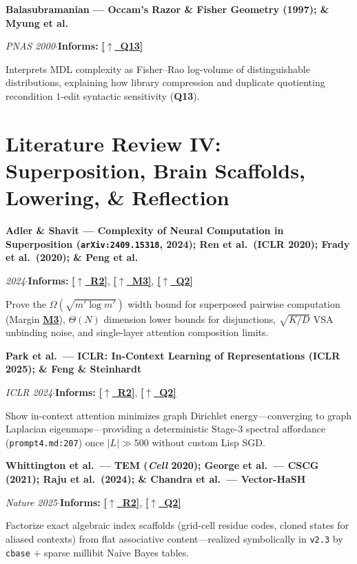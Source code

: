 \documentclass[12pt]{article}
\newcommand{\secback}[2]{\hyperref[#1]{\textcolor{linkblue}{\textbf{\small[\(\uparrow\)~#2]}}}}
\newcommand{\litentry}[4]{%
  \par\medskip\noindent\hypertarget{lit:#1}{}%
  \textbf{#2}\par\nopagebreak\noindent
  {\footnotesize\textit{#3}\quad$\cdot$\quad\textbf{Informs:} #4}\par\nopagebreak\smallskip\noindent\ignorespaces
}
\begin{document}
\litentry{balasubramanian1997}{Balasubramanian --- Occam's Razor \& Fisher Geometry (1997); \& \hypertarget{lit:myung2000}{}Myung et al.}{\emph{PNAS} 2000}{\secback{ans:13}{Q13}}
Interprets MDL complexity as Fisher--Rao log-volume of distinguishable distributions, explaining how library compression and duplicate quotienting recondition $1$-edit syntactic sensitivity (\textbf{Q13}).

\section{Literature Review IV: Superposition, Brain Scaffolds, Lowering, \& Reflection}
\label{sec:app-d}

\litentry{adler2024}{Adler \& Shavit --- Complexity of Neural Computation in Superposition (\texttt{arXiv:2409.15318}, 2024); \hypertarget{lit:ren2020}{}Ren et al.\ (ICLR 2020); \hypertarget{lit:frady2020}{}Frady et al.\ (2020); \& \hypertarget{lit:peng2024}{}Peng et al.}{2024}{\secback{sec:thesis}{R2}, \secback{sec:marginalia}{M3}, \secback{ans:2}{Q2}}
Prove the $\Omega(\sqrt{m'\log m'})$ width bound for superposed pairwise computation (Margin \hyperlink{q:m3}{\textbf{M3}}), $\Theta(N)$ dimension lower bounds for disjunctions, $\sqrt{K/D}$ VSA unbinding noise, and single-layer attention composition limits.

\litentry{park2025}{Park et al.\ --- ICLR: In-Context Learning of Representations (ICLR 2025); \& \hypertarget{lit:feng2024}{}Feng \& Steinhardt}{ICLR 2024}{\secback{sec:thesis}{R2}, \secback{ans:2}{Q2}}
Show in-context attention minimizes graph Dirichlet energy---converging to graph Laplacian eigenmaps---providing a deterministic Stage-3 spectral affordance (\texttt{prompt4.md:207}) once $|L|\gg 500$ without custom Lisp SGD.

\litentry{whittington2020}{Whittington et al.\ --- TEM (\emph{Cell} 2020); \hypertarget{lit:george2021}{}George et al.\ --- CSCG (2021); \hypertarget{lit:raju2024}{}Raju et al.\ (2024); \& \hypertarget{lit:chandra2025}{}Chandra et al.\ --- Vector-HaSH}{\emph{Nature} 2025}{\secback{sec:thesis}{R2}, \secback{ans:2}{Q2}}
Factorize exact algebraic index scaffolds (grid-cell residue codes, cloned states for aliased contexts) from flat associative content---realized symbolically in \texttt{v2.3} by \texttt{cbase} $+$ sparse millibit Naive Bayes tables.
\end{document}
